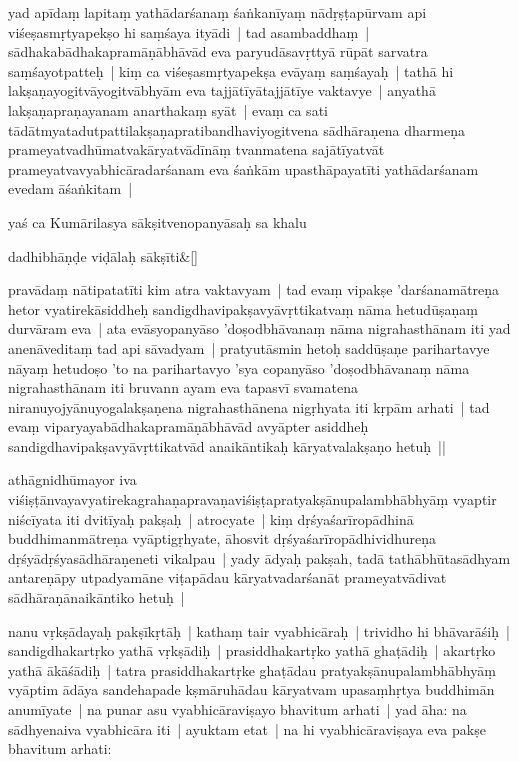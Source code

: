 \documentclass[article,12pt,a4paper]{memoir}
\newcommand{\gap}[1]{}
\begin{document}
	  \pstart yad apīdaṃ lapitaṃ yathādarśanaṃ śaṅkanīyaṃ nādṛṣṭapūrvam api viśeṣasmṛtyapekṣo hi saṃśaya ityādi | tad asambaddhaṃ | sādhakabādhakapramāṇābhāvād eva paryudāsavṛttyā rūpāt sarvatra saṃśayotpatteḥ | kiṃ ca viśeṣasmṛtyapekṣa evāyaṃ saṃśayaḥ | tathā hi lakṣaṇayogitvāyogitvābhyām eva tajjātīyātajjātīye vaktavye | anyathā lakṣaṇapraṇayanam anarthakaṃ syāt | evaṃ ca sati tādātmyatadutpattilakṣaṇapratibandhaviyogitvena sādhāraṇena dharmeṇa prameyatvadhūmatvakārya\leavevmode{}tvādīnāṃ tvanmatena sajātīyatvāt prameyatvavyabhicāradarśanam eva śaṅkām upasthāpayatīti yathādarśanam evedam āśaṅkitam |
	\pend
      

	  \pstart yaś ca Kumārilasya sākṣitvenopanyāsaḥ sa khalu 
	    \pend
	  
	    
	    \stanza[\smallbreak]
	dadhibhāṇḍe viḍālaḥ sākṣīti\&[\smallbreak]


	
	    \pstart
	   pravādaṃ nātipatatīti kim atra vaktavyam | tad evaṃ vipakṣe 'darśanamātreṇa hetor vyatirekāsiddheḥ sandigdhavipakṣavyāvṛttikatvaṃ nāma hetudūṣaṇaṃ durvāram eva | ata evāsyopanyāso 'doṣodbhāvanaṃ nāma nigrahasthānam iti yad anenāveditaṃ tad api sāvadyam | pratyutāsmin heto\gap{}ḥ saddūṣaṇe parihartavye nāyaṃ hetudoṣo 'to na parihartavyo 'sya copanyāso 'doṣodbhāvanaṃ nāma nigrahasthānam iti bruvann ayam eva tapasvī svamatena niranuyojyānuyogalakṣaṇena nigrahasthānena nigṛhyata iti kṛpām arhati | tad evaṃ viparyayabādhakapramāṇābhāvād avyāpter asiddheḥ sandigdhavipakṣavyāvṛttikatvād anaikāntikaḥ kāryatvalakṣaṇo hetuḥ ||
	\pend
      
	  
	

	  \pstart athāgnidhūmayor iva viśiṣṭānvayavyatirekagrahaṇapravaṇaviśiṣṭapratyakṣānupalambhābhyāṃ vyaptir niścīyata iti dvitīyaḥ pakṣaḥ | atrocyate | kiṃ dṛśyaśarīropādhinā buddhimanmātreṇa vyāptigṛhyate, āhosvit dṛśyaśarīropādhividhureṇa dṛśyādṛśyasādhāraṇeneti vikalpau | yady ādyaḥ pakṣah, tadā tathābhūtasādhyam antareṇāpy utpadyamāne viṭapādau kāryatvadarśanāt prameyatvādivat sādhāraṇānaikāntiko hetuḥ |
	\pend
      

	  \pstart {}\label{thakur75-44.2} nanu vṛkṣādayaḥ pakṣīkṛtāḥ | kathaṃ tair vyabhicāraḥ | trividho hi bhāvarāśiḥ | sandigdhakartṛko yathā vṛkṣādiḥ | prasiddhakartṛko yathā ghaṭādiḥ | akartṛko yathā ākāśādiḥ | tatra prasiddhakartṛke ghaṭādau pratyakṣānupalambhābhyāṃ vyāptim ādāya sandehapade kṣmāruhādau kāryatvam upasaṃhṛtya buddhimān anumīyate | na punar asu vyabhicāraviṣayo bhavitum arhati | \label{thakur75-44.8} yad āha: na sādhyenaiva vyabhicāra iti | ayuktam etat | na hi vyabhicāraviṣaya eva pakṣe bhavitum arhati:
	\pend
      
\end{document}
